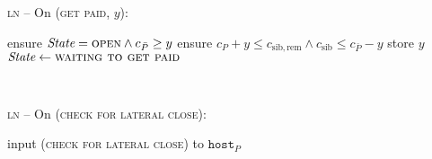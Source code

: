 \begin{center}
  \begin{processbox}{\textsc{ln} -- On (\textsc{get paid}, $y$):}
    \ \\
    \begin{algorithmic}[1]
      \State ensure $\itistate = \textsc{open} \wedge c_{\bar{P}} \geq y$
       
        \State ensure $c_P + y \leq c_{\mathrm{sib}, \mathrm{rem}} \wedge
        c_{\mathrm{sib}} \leq c_{\bar{P}} - y$ 
      \EndIf
      \State store $y$
      \State $\itistate \gets \textsc{waiting to get paid}$
      \label{code:ln:get-paid:state}
    \end{algorithmic}
  \end{processbox}
  \label{code:ln:get-paid}
\end{center} \ \\

\begin{center}
  \begin{processbox}{\textsc{ln} -- On (\textsc{check for lateral close}):}
    \ \\
    \begin{algorithmic}[1]
        \State input (\textsc{check for lateral close}) to
        $\texttt{host}_P$
      \EndIf
    \end{algorithmic}
  \end{processbox}
  \label{code:ln:poll-virtual}
\end{center} \ \\

